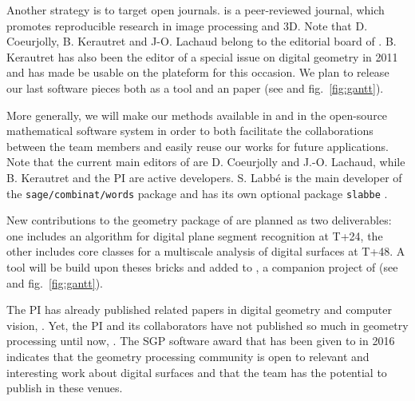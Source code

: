 Another strategy is to target open journals. {\IPOL} is a peer-reviewed journal, which promotes
reproducible research in image processing and 3D. Note that D. Coeurjolly, B. Kerautret and J-O. Lachaud
belong to the editorial board of {\IPOL}. B. Kerautret has also been the editor of a special issue on
digital geometry in 2011 and has made {\DGtal} be usable on the {\IPOL} plateform for this occasion. 
We plan to release our last software pieces both as a {\DGtal} tool and an {\IPOL} paper
(see  and fig.~\ref{fig:gantt}).

More generally, we will make our methods available in {\DGtal} 
and in the open-source mathematical software system {\sage}
in order to both facilitate the collaborations between the team members
and easily reuse our works for future applications.
Note that the current main editors of {\DGtal} are {D. Coeurjolly} and
{J.-O. Lachaud}, while {B. Kerautret} and the PI are active developers.
S. Labb\'{e} is the main developer of the \texttt{sage/combinat/words} package
and has its own optional package \texttt{slabbe}
\cite{labbe_slabbe_0_4_2018}.

New contributions to the geometry package of
{\DGtal} are planned as two deliverables: one includes an algorithm for
digital plane segment recognition at T+24, the other includes core classes
for a multiscale analysis of digital surfaces at T+48. A tool will be build
upon theses bricks and added to {\DGtalTools}, a companion project of
{\DGtal} (see  and fig.~\ref{fig:gantt}).  


The PI has already published related papers in digital geometry and computer vision,
\eg \cite{LPRTCS2016,LPRDGCI2016,LPRJMIV2017}. 
Yet, the PI and its collaborators have not published so much in geometry processing until now,
\eg \cite{Coeurjolly2017}.
The SGP software award that has been given to {\DGtal} in 2016 indicates that the
geometry processing community is open to relevant and interesting work about digital surfaces
and that the team has the potential to publish in these venues.


